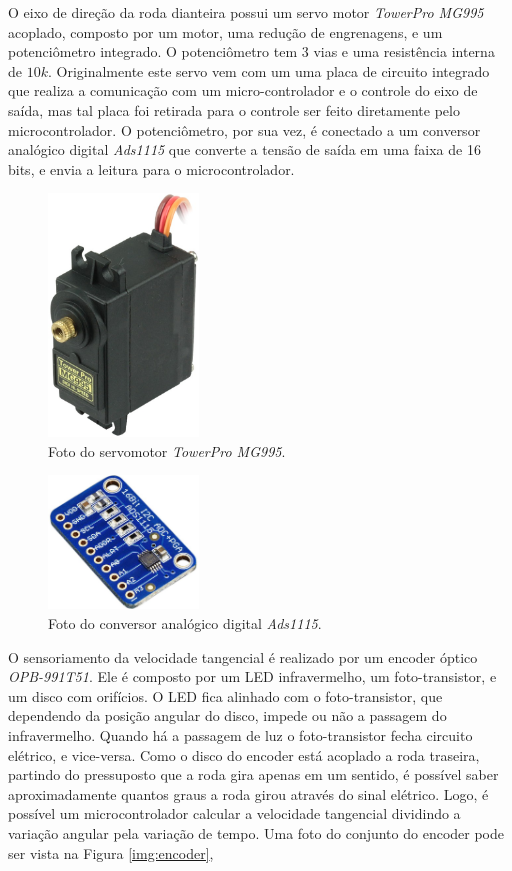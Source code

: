         	O eixo de direção da roda dianteira possui um servo motor \textit{TowerPro MG995} acoplado, composto por um motor, uma redução de engrenagens, e um potenciômetro integrado. O potenciômetro tem 3 vias e uma resistência interna de $10k$. Originalmente este servo vem com um uma placa de circuito integrado que realiza a comunicação com um micro-controlador e o controle do eixo de saída, mas tal placa foi retirada para o controle ser feito diretamente pelo microcontrolador. O potenciômetro, por sua vez, é conectado a um conversor analógico digital \textit{Ads1115} que converte a tensão de saída em uma faixa de 16 bits, e envia a leitura para o microcontrolador.
    	
        	\begin{figure}[h]
                \centering
                \includegraphics[width=4cm]{Imagens/cap2/995.png}
                \caption{Foto do servomotor \textit{TowerPro MG995}.}
                \label{img:theta}
            \end{figure}
            
            \begin{figure}[h]
                \centering
                \includegraphics[width=4cm]{Imagens/cap2/ads.png}
                \caption{Foto do conversor analógico digital \textit{Ads1115}.}
                \label{img:theta}
            \end{figure}
            
        	O sensoriamento da velocidade tangencial é realizado por um encoder óptico \textit{OPB-991T51}. Ele é composto por um LED infravermelho, um foto-transistor, e um disco com orifícios. O LED fica alinhado com o foto-transistor, que dependendo da posição angular do disco, impede ou não a passagem do infravermelho. Quando há a passagem de luz o foto-transistor fecha circuito elétrico, e vice-versa. Como o disco do encoder está acoplado a roda traseira, partindo do pressuposto que a roda gira apenas em um sentido, é possível saber aproximadamente quantos graus a roda girou através do sinal elétrico. Logo, é possível um microcontrolador calcular a velocidade tangencial dividindo a variação angular pela variação de tempo. Uma foto do conjunto do encoder pode ser vista na Figura \ref{img:encoder},
        	
